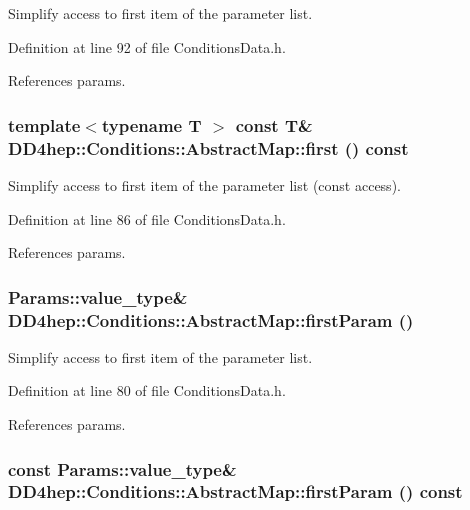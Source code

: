 Simplify access to first item of the parameter list. 

Definition at line 92 of file ConditionsData.h.

References params.\hypertarget{class_d_d4hep_1_1_conditions_1_1_abstract_map_aa91b0ffcc6a4dcb6726d04412a083392}{
\subsubsection[{first}]{\setlength{\rightskip}{0pt plus 5cm}template$<$typename T $>$ const {\bf T}\& DD4hep::Conditions::AbstractMap::first () const}}
\label{class_d_d4hep_1_1_conditions_1_1_abstract_map_aa91b0ffcc6a4dcb6726d04412a083392}


Simplify access to first item of the parameter list (const access). 

Definition at line 86 of file ConditionsData.h.

References params.\hypertarget{class_d_d4hep_1_1_conditions_1_1_abstract_map_acedd8446b04dc419fd9f73611f01b2ef}{
\subsubsection[{firstParam}]{\setlength{\rightskip}{0pt plus 5cm}Params::value\_\-type\& DD4hep::Conditions::AbstractMap::firstParam ()}}
\label{class_d_d4hep_1_1_conditions_1_1_abstract_map_acedd8446b04dc419fd9f73611f01b2ef}


Simplify access to first item of the parameter list. 

Definition at line 80 of file ConditionsData.h.

References params.\hypertarget{class_d_d4hep_1_1_conditions_1_1_abstract_map_a14b35adc0a8058a0f53c7f6bc3e4dc30}{
\subsubsection[{firstParam}]{\setlength{\rightskip}{0pt plus 5cm}const Params::value\_\-type\& DD4hep::Conditions::AbstractMap::firstParam () const}}
\label{class_d_d4hep_1_1_conditions_1_1_abstract_map_a14b35adc0a8058a0f53c7f6bc3e4dc30}


